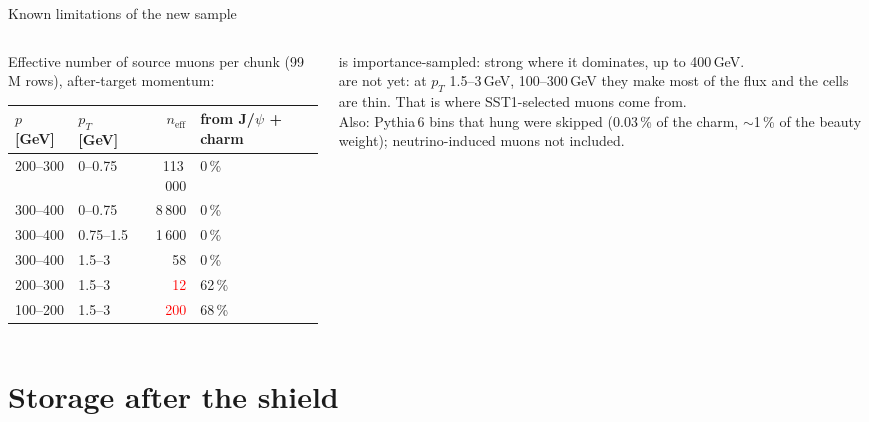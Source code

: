 \documentclass[aspectratio=169,10pt]{beamer}
\begin{document}
\begin{frame}{Known limitations of the new sample}
  \begin{columns}[c]
    \begin{column}{0.52\textwidth}\footnotesize
      Effective number of source muons per chunk (99\,M rows), after-target momentum:\\[1mm]
      \begin{tabular}{@{}llrl@{}}
        \toprule
        $p$ [GeV] & $p_T$ [GeV] & $n_\text{eff}$ & from J/$\psi$ + charm\\
        \midrule
        200--300 & 0--0.75 & 113\,000 & 0\,\%\\
        300--400 & 0--0.75 & 8\,800 & 0\,\%\\
        300--400 & 0.75--1.5 & 1\,600 & 0\,\%\\
        300--400 & 1.5--3 & 58 & 0\,\%\\
        200--300 & 1.5--3 & \textcolor{red}{12} & 62\,\%\\
        100--200 & 1.5--3 & \textcolor{red}{200} & 68\,\%\\
        \bottomrule
      \end{tabular}
    \end{column}
    \begin{column}{0.44\textwidth}\footnotesize
       is importance-sampled: strong where it dominates, up to 400\,GeV.\\[1.5mm]
       are not yet: at $p_T$ 1.5--3\,GeV, 100--300\,GeV they make most of the flux and the cells are thin. That is where SST1-selected muons come from.\\[1.5mm]
      Also: Pythia\,6 bins that hung were skipped (0.03\,\% of the charm, $\sim$1\,\% of the beauty weight); neutrino-induced muons not included.\\[1.5mm]
    \end{column}
  \end{columns}
\end{frame}

\section{Storage after the shield}
\end{document}
